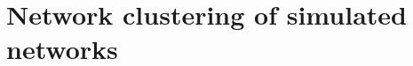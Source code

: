 \section{Network clustering of simulated networks}\label{sec:network-clustering-of-simulated-networks}
